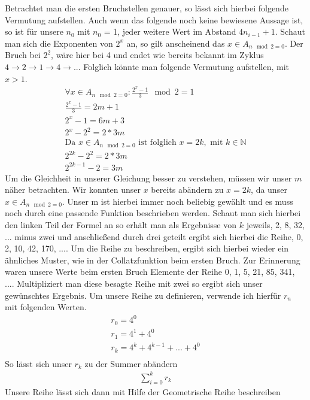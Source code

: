 \documentclass{article}
\begin{document}
\noindent Betrachtet man die ersten Bruchstellen genauer, so lässt sich hierbei folgende Vermutung aufstellen. Auch wenn das folgende noch keine bewiesene Aussage ist, so ist für unsere $n_{0}$ mit $n_{0}$ = 1, jeder weitere Wert im Abstand $4n_{i-1}+1$. Schaut man sich die Exponenten von $2^x$ an, so gilt anscheinend das $x \in A_{n \mod 2 = 0}$. Der Bruch bei $2^2$, wäre hier bei 4 und endet wie bereits bekannt im Zyklus $4 \rightarrow 2 \rightarrow 1 \rightarrow 4 \rightarrow ... $ Folglich könnte man folgende Vermutung aufstellen, mit $x > 1$.
\begin{gather*}
\forall x \in A_{n \mod 2 = 0}: \frac{2^{x}-1}{3} \mod 2 = 1 \\
\frac{2^{x}-1}{3} = 2m + 1 \\
2^{x}-1 = 6m + 3\\
2^{x}-2^2 = 2 * 3m \\
\text{Da } x \in A_{n \mod 2 = 0} \text{ ist folglich } x = 2k, \text{ mit } k \in \mathbb{N}\\
2^{2k} - 2^2 = 2 * 3m \\
2^{2k-1} - 2 = 3m
\end{gather*}
\noindent Um die Gleichheit in unserer Gleichung besser zu verstehen, müssen wir unser $m$ näher betrachten. Wir konnten unser $x$ bereits abändern zu $x = 2k$, da unser $x \in A_{n \mod 2 = 0}$. Unser m ist hierbei immer noch beliebig gewählt und es muss noch durch eine passende Funktion beschrieben werden. Schaut man sich hierbei den linken Teil der Formel an so erhält man als Ergebnisse von $k$ jeweils, 2, 8, 32, ... minus zwei und anschließend durch drei geteilt ergibt sich hierbei die Reihe, 0, 2, 10, 42, 170, .... Um die Reihe zu beschreiben, ergibt sich hierbei wieder ein ähnliches Muster, wie in der Collatzfunktion beim ersten Bruch. Zur Erinnerung waren unsere Werte beim ersten Bruch Elemente der Reihe 0, 1, 5, 21, 85, 341, .... Multipliziert man diese besagte Reihe mit zwei so ergibt sich unser gewünschtes Ergebnis. Um unsere Reihe zu definieren, verwende ich hierfür $r_{n}$ mit folgenden Werten. 
\begin{gather*}
r_{0} = 4^0 \\
r_{1} = 4^1 + 4^0\\
r_{k} = 4^k + 4^{k-1} + ... + 4^0\\
\end{gather*}
\noindent So lässt sich unser $r_{k}$ zu der Summer abändern
\begin{gather*}
\sum_{i=0}^{k}r_{k}
\end{gather*}
Unsere Reihe lässt sich dann mit Hilfe der Geometrische Reihe beschreiben 
\end{document}
